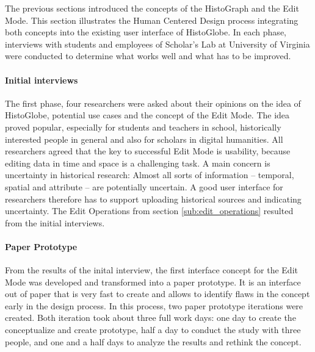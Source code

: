 The previous sections introduced the concepts of the HistoGraph and the Edit Mode. This section illustrates the Human Centered Design process integrating both concepts into the existing user interface of HistoGlobe. In each phase, interviews with students and employees of Scholar's Lab at University of Virginia were conducted to determine what works well and what has to be improved.

\paragraph{Initial interviews} %
\label{par:initial_interviews}

The first phase, four researchers were asked about their opinions on the idea of HistoGlobe, potential use cases and the concept of the Edit Mode. The idea proved popular, especially for students and teachers in school, historically interested people in general and also for scholars in digital humanities. All researchers agreed that the key to successful Edit Mode is usability, because editing data in time and space is a challenging task. A main concern is uncertainty in historical research: Almost all sorts of information -- temporal, spatial and attribute -- are potentially uncertain. A good user interface for researchers therefore has to support uploading historical sources and indicating uncertainty. The Edit Operations from section \ref{sub:edit_operations} resulted from the initial interviews.



\paragraph{Paper Prototype} %
\label{par:paper_prototype}

From the results of the inital interview, the first interface concept for the Edit Mode was developed and transformed into a paper prototype. It is an interface out of paper that is very fast to create and allows to identify flaws in the concept early in the design process. In this process, two paper prototype iterations were created. Both iteration took about three full work days: one day to create the conceptualize and create prototype, half a day to conduct the study with three people, and one and a half days to analyze the results and rethink the concept.

